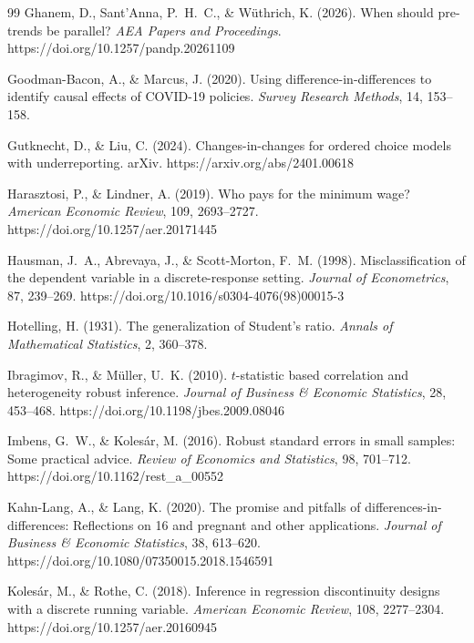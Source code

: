 \documentclass[12pt]{article}
\theoremstyle{definition}
\numberwithin{equation}{section}
\begin{document}
\begin{thebibliography}{99}
 Ghanem, D., Sant'Anna, P.~H.~C., \& W\"uthrich, K. (2026). When should pre-trends be parallel? \emph{AEA Papers and Proceedings}. https://doi.org/10.1257/pandp.20261109

 Goodman-Bacon, A., \& Marcus, J. (2020). Using difference-in-differences to identify causal effects of COVID-19 policies. \emph{Survey Research Methods}, 14, 153--158.

 Gutknecht, D., \& Liu, C. (2024). Changes-in-changes for ordered choice models with underreporting. arXiv. https://arxiv.org/abs/2401.00618

 Harasztosi, P., \& Lindner, A. (2019). Who pays for the minimum wage? \emph{American Economic Review}, 109, 2693--2727. https://doi.org/10.1257/aer.20171445

 Hausman, J.~A., Abrevaya, J., \& Scott-Morton, F.~M. (1998). Misclassification of the dependent variable in a discrete-response setting. \emph{Journal of Econometrics}, 87, 239--269. https://doi.org/10.1016/s0304-4076(98)00015-3

 Hotelling, H. (1931). The generalization of Student's ratio. \emph{Annals of Mathematical Statistics}, 2, 360--378.

 Ibragimov, R., \& M\"uller, U.~K. (2010). $t$-statistic based correlation and heterogeneity robust inference. \emph{Journal of Business \& Economic Statistics}, 28, 453--468. https://doi.org/10.1198/jbes.2009.08046

 Imbens, G.~W., \& Koles\'ar, M. (2016). Robust standard errors in small samples: Some practical advice. \emph{Review of Economics and Statistics}, 98, 701--712. https://doi.org/10.1162/rest\_a\_00552

 Kahn-Lang, A., \& Lang, K. (2020). The promise and pitfalls of differences-in-differences: Reflections on 16 and pregnant and other applications. \emph{Journal of Business \& Economic Statistics}, 38, 613--620. https://doi.org/10.1080/07350015.2018.1546591

 Koles\'ar, M., \& Rothe, C. (2018). Inference in regression discontinuity designs with a discrete running variable. \emph{American Economic Review}, 108, 2277--2304. https://doi.org/10.1257/aer.20160945


\end{thebibliography}
\end{document}
